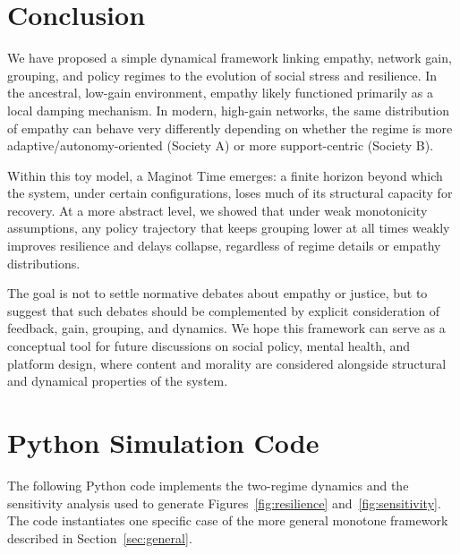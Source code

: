 \documentclass[11pt]{article}
\theoremstyle{plain}
\begin{document}
\section{Conclusion}

We have proposed a simple dynamical framework linking empathy, network gain, grouping, and policy regimes to the evolution of social stress and resilience.
In the ancestral, low-gain environment, empathy likely functioned primarily as a local damping mechanism.
In modern, high-gain networks, the same distribution of empathy can behave very differently depending on whether the regime is more adaptive/autonomy-oriented (Society A) or more support-centric (Society B).

Within this toy model, a Maginot Time emerges: a finite horizon beyond which the system, under certain configurations, loses much of its structural capacity for recovery.
At a more abstract level, we showed that under weak monotonicity assumptions, any policy trajectory that keeps grouping lower at all times weakly improves resilience and delays collapse, regardless of regime details or empathy distributions.

The goal is not to settle normative debates about empathy or justice, but to suggest that such debates should be complemented by explicit consideration of feedback, gain, grouping, and dynamics.
We hope this framework can serve as a conceptual tool for future discussions on social policy, mental health, and platform design, where content and morality are considered alongside structural and dynamical properties of the system.

\appendix

\section{Python Simulation Code}
\label{app:code}

The following Python code implements the two-regime dynamics and the sensitivity analysis used to generate Figures~\ref{fig:resilience} and~\ref{fig:sensitivity}.
The code instantiates one specific case of the more general monotone framework described in Section~\ref{sec:general}.
\end{document}
